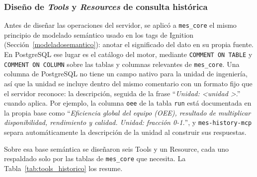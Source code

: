 \subsubsection{Diseño de \textit{Tools} y \textit{Resources} de consulta histórica}
\label{toolconsultahistorica}

Antes de diseñar las operaciones del servidor, se aplicó a \texttt{mes\_core} el mismo principio de modelado semántico usado en los tags de Ignition
(Sección~\ref{modeladosemantico}): anotar el significado del dato en su propia fuente. En PostgreSQL ese lugar es el catálogo del motor, mediante \texttt{COMMENT ON TABLE} y \texttt{COMMENT ON COLUMN} sobre las tablas y columnas relevantes de \texttt{mes\_core}. Una columna de PostgreSQL no tiene un campo nativo para la unidad de ingeniería, así que la unidad se incluye dentro del mismo comentario con un formato fijo que el servidor reconoce: la descripción, seguida de la frase ``\emph{Unidad: \textless unidad \textgreater}.'' cuando aplica. Por ejemplo, la columna \texttt{oee} de la tabla \texttt{run} está documentada en la propia base como ``\emph{Eficiencia global del equipo (OEE), resultado de multiplicar disponibilidad, rendimiento y calidad. Unidad: fracción 0-1.}'', y \texttt{mes-history-mcp} separa automáticamente la descripción de la unidad al construir sus respuestas.

Sobre esa base semántica se diseñaron seis Tools y un Resource, cada uno respaldado solo por
las tablas de \texttt{mes\_core} que necesita. La Tabla~\ref{tab:tools_historico} los resume.

